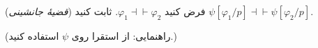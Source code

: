 (\emph{قضیهٔ جانشینی})
فرض کنید
$\varphi_1\dashv\vdash\varphi_2$.
ثابت کنید
$\psi[\varphi_1/p]\dashv\vdash\psi[\varphi_2/p]$.

(راهنمایی: از استقرا روی $\psi$ استفاده کنید.)